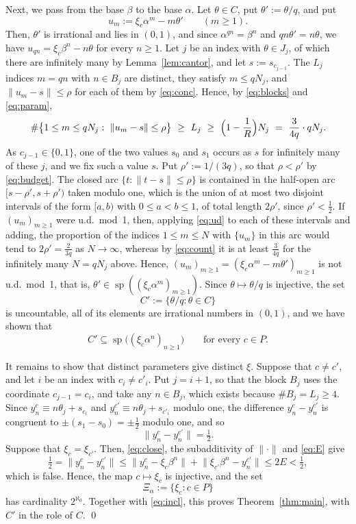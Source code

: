 \documentclass[11pt,reqno]{amsart}
\theoremstyle{definition}
\theoremstyle{remark}
\numberwithin{equation}{section}
\DeclareMathOperator{\spec}{sp}
\begin{document}
Next, we pass from the base $\beta$ to the base $\alpha$. Let $\theta\in C$, put $\theta':=\theta/q$, and put
\[
u_m:=\xi_c\alpha^m-m\theta'\qquad(m\ge1).
\]
Then, $\theta'$ is irrational and lies in $(0,1)$, and since $\alpha^{qn}=\beta^n$ and $qn\theta'=n\theta$, we have $u_{qn}=\xi_c\beta^n-n\theta$ for every $n\ge1$. Let $j$ be an index with $\theta\in J_j$, of which there are infinitely many by Lemma~\ref{lem:cantor}, and let $s:=s_{c_{j-1}}$. The $L_j$ indices $m=qn$ with $n\in B_j$ are distinct, they satisfy $m\le qN_j$, and $\|u_m-s\|\le\rho$ for each of them by \eqref{eq:conc}. Hence, by \eqref{eq:blocks} and \eqref{eq:param},
\begin{equation}\label{eq:count}
\#\bigl\{1\le m\le qN_j:\ \|u_m-s\|\le\rho\bigr\}\ \ge\ L_j\ \ge\ \Bigl(1-\frac1R\Bigr)N_j\ =\ \frac3{4q}\cdot qN_j .
\end{equation}
As $c_{j-1}\in\{0,1\}$, one of the two values $s_0$ and $s_1$ occurs as $s$ for infinitely many of these $j$, and we fix such a value $s$. Put $\rho':=1/(3q)$, so that $\rho<\rho'$ by \eqref{eq:budget}. The closed arc $\{t:\|t-s\|\le\rho\}$ is contained in the half-open arc $[s-\rho',s+\rho')$ taken modulo one, which is the union of at most two disjoint intervals of the form $[a,b)$ with $0\le a<b\le1$, of total length $2\rho'$, since $\rho'<\tfrac12$. If $(u_m)_{m\ge1}$ were u.d.\ mod~1, then, applying \eqref{eq:ud} to each of these intervals and adding, the proportion of the indices $1\le m\le N$ with $\{u_m\}$ in this arc would tend to $2\rho'=\tfrac2{3q}$ as $N\to\infty$, whereas by \eqref{eq:count} it is at least $\tfrac3{4q}$ for the infinitely many $N=qN_j$ above. Hence, $(u_m)_{m\ge1}=(\xi_c\alpha^m-m\theta')_{m\ge1}$ is not u.d.\ mod~1, that is, $\theta'\in\spec((\xi_c\alpha^m)_{m\ge1})$. Since $\theta\mapsto\theta/q$ is injective, the set
\[
C':=\bigl\{\theta/q:\theta\in C\bigr\}
\]
is uncountable, all of its elements are irrational numbers in $(0,1)$, and we have shown that
\begin{equation}\label{eq:incl}
C'\subseteq\spec\bigl((\xi_c\alpha^n)_{n\ge1}\bigr)\qquad\text{for every }c\in P .
\end{equation}

It remains to show that distinct parameters give distinct $\xi$. Suppose that $c\ne c'$, and let $i$ be an index with $c_i\ne c'_i$. Put $j=i+1$, so that the block $B_j$ uses the coordinate $c_{j-1}=c_i$, and take any $n\in B_j$, which exists because $\#B_j=L_j\ge4$. Since $y^c_n\equiv n\theta_j+s_{c_i}$ and $y^{c'}_n\equiv n\theta_j+s_{c'_i}$ modulo one, the difference $y^c_n-y^{c'}_n$ is congruent to $\pm(s_1-s_0)=\pm\tfrac12$ modulo one, and so
\[
\bigl\|y^c_n-y^{c'}_n\bigr\|=\tfrac12 .
\]
Suppose that $\xi_c=\xi_{c'}$. Then, \eqref{eq:close}, the subadditivity of $\|\cdot\|$ and \eqref{eq:E} give
\[
\tfrac12=\bigl\|y^c_n-y^{c'}_n\bigr\|\le\bigl\|y^c_n-\xi_c\beta^n\bigr\|+\bigl\|\xi_{c'}\beta^n-y^{c'}_n\bigr\|\le2E<\tfrac12 ,
\]
which is false. Hence, the map $c\mapsto\xi_c$ is injective, and the set
\[
\Xi_\alpha:=\bigl\{\xi_c:c\in P\bigr\}
\]
has cardinality $2^{\aleph_0}$. Together with \eqref{eq:incl}, this proves Theorem~\ref{thm:main}, with $C'$ in the role of $C$. \qed
\end{document}
